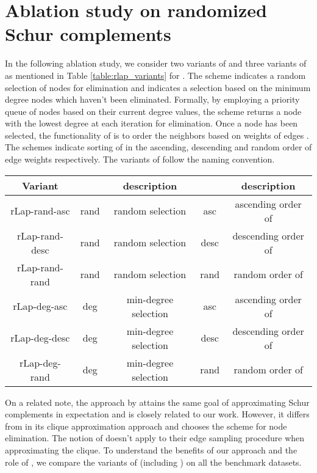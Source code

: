 \documentclass{article}
\theoremstyle{plain}
\theoremstyle{definition}
\theoremstyle{remark}
\begin{document}
\section{Ablation study on randomized Schur complements}
\label{app:rlap_ablation}

In the following ablation study, we consider two variants of  and three variants of  as mentioned in Table \ref{table:rlap_variants} for . The scheme  indicates a random selection of nodes for elimination and  indicates a selection based on the minimum degree nodes which haven't been eliminated. Formally, by employing a priority queue of nodes based on their current degree values, the  scheme returns a node with the lowest degree at each iteration for elimination. Once a node  has been selected, the functionality of  is to order the neighbors  based on weights of edges . The schemes  indicate sorting of  in the ascending, descending and random order of edge weights respectively. The variants of  follow the  naming convention.

\begin{table*}[ht!]
\centering
\caption{Variants of  based on .}
\label{table:rlap_variants}
\vskip 0.15in
\begin{center}
\begin{small}
\begin{sc}
\begin{tabular}{c|c|c|c|c}
\toprule
Variant &  &  description &  &  description\\
\midrule
rLap-rand-asc & rand & random selection & asc & ascending order of   \\
rLap-rand-desc & rand & random selection & desc & descending order of   \\
rLap-rand-rand & rand & random selection & rand & random order of   \\
rLap-deg-asc & deg & min-degree selection & asc & ascending order of   \\
rLap-deg-desc & deg & min-degree selection & desc & descending order of   \\
rLap-deg-rand & deg & min-degree selection & rand & random order of   \\
\bottomrule
\end{tabular}
\end{sc}
\end{small}
\end{center}
\vskip -0.1in
\end{table*}

On a related note, the  approach by \citet{fahrbach2020faster} attains the same goal of approximating Schur complements in expectation and is closely related to our work. However, it differs from  in its clique approximation approach and chooses the  scheme for node elimination. The notion of  doesn't apply to their edge sampling procedure when approximating the clique. To understand the benefits of our approach and the role of , we compare the variants of  (including ) on all the benchmark datasets.
\end{document}
